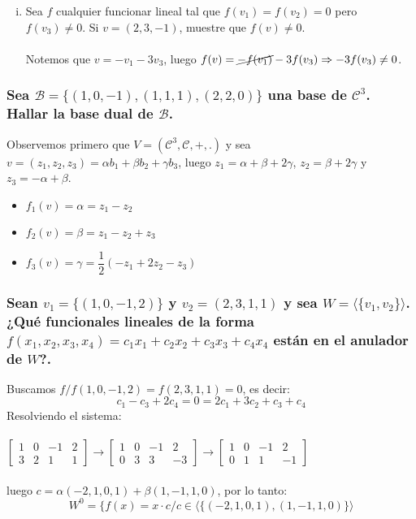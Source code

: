 \documentclass{article}
\begin{document}
\begin{enumerate}[i.]
\item
	Sea $f$ cualquier funcionar lineal tal que $f(v_1)=f(v_2)=0$ pero $f(v_3) \not = 0$. Si $v = (2,3,-1)$, muestre
	que $f(v) \not = 0$. \\ \\
	Notemos que $v = -v_1-3v_3$, luego $f(v) = \cancel{-f(v_1)} - 3f(v_3) \Rightarrow -3f(v_3) \not = 0$.
\end{enumerate}


\subsubsection{Sea $\mathcal{B} = \{ (1,0,-1),(1,1,1),(2,2,0) \}$ una base de $\mathcal{C}^3$. Hallar la base dual de
$\mathcal{B}$.}
Observemos primero que $V = (\mathcal{C}^3,\mathcal{C},+,.)$ y sea $v = (z_1,z_2,z_3) = \alpha b_1 + \beta b_2 + \gamma b_3$,
luego $z_1 = \alpha + \beta + 2\gamma$, $z_2 = \beta + 2\gamma$ y $z_3 = -\alpha + \beta$.
\begin{itemize}
\item
	$f_1(v) = \alpha = z_1-z_2$
\item
	$f_2(v) = \beta = z_1-z_2+z_3$
\item
	$f_3(v) = \gamma = \dfrac{1}2 ( -z_1+2z_2-z_3)$

\end{itemize}

\subsubsection{Sean $v_1 = \{ (1,0,-1,2) \}$ y $v_2 = (2,3,1,1)$ y sea $W = \langle \{ v_1,v_2 \}
\rangle$. ¿Qué funcionales lineales de la forma $f(x_1,x_2,x_3,x_4)=c_1x_1+c_2x_2+c_3x_3+c_4x_4$
están en el anulador de $W$?.}
Buscamos $f/f(1,0,-1,2) = f(2,3,1,1) = 0$, es decir: \\
\[
c_1-c_3+2c_4 = 0 = 2c_1+3c_2+c_3+c_4
\]
Resolviendo el sistema: \\ \\
$\begin{bmatrix} 1&0&-1&2 \\ 3&2&1&1 \end{bmatrix} \rightarrow \begin{bmatrix} 1&0&-1&2 \\ 0&3&3&-3 \end{bmatrix}
\rightarrow \begin{bmatrix} 1&0&-1&2 \\ 0&1&1&-1\end{bmatrix}$
\\ \\
luego $c = \alpha(-2,1,0,1)+\beta(1,-1,1,0)$, por lo tanto:
\[
W^0 = \{ f(x) = x \cdot c/c \in \langle \{ (-2,1,0,1),(1,-1,1,0) \} \rangle
\]
\end{document}
